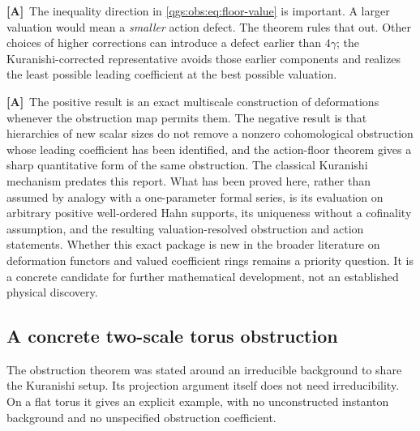 \documentclass[11pt,oneside]{article}
\numberwithin{equation}{section}
\theoremstyle{plain}
\theoremstyle{definition}
\theoremstyle{remark}
\newcommand{\TA}{\textcolor{TierA}{\textsf{\bfseries[A]}}}
\begin{document}
\TA\ The inequality direction in \eqref{qgs:obs:eq:floor-value} is important. A larger valuation would mean a \emph{smaller} action defect. The theorem rules that out. Other choices of higher corrections can introduce a defect earlier than $4\gamma$; the Kuranishi-corrected representative avoids those earlier components and realizes the least possible leading coefficient at the best possible valuation.

\TA\ The positive result is an exact multiscale construction of deformations whenever the obstruction map permits them. The negative result is that hierarchies of new scalar sizes do not remove a nonzero cohomological obstruction whose leading coefficient has been identified, and the action-floor theorem gives a sharp quantitative form of the same obstruction. The classical Kuranishi mechanism predates this report. What has been proved here, rather than assumed by analogy with a one-parameter formal series, is its evaluation on arbitrary positive well-ordered Hahn supports, its uniqueness without a cofinality assumption, and the resulting valuation-resolved obstruction and action statements. Whether this exact package is new in the broader literature on deformation functors and valued coefficient rings remains a priority question. It is a concrete candidate for further mathematical development, not an established physical discovery.

\subsection{A concrete two-scale torus obstruction}\label{qgs:obs:sec:torus-obstruction}
The obstruction theorem was stated around an irreducible background to share the Kuranishi setup. Its projection argument itself does not need irreducibility. On a flat torus it gives an explicit example, with no unconstructed instanton background and no unspecified obstruction coefficient.
\end{document}

